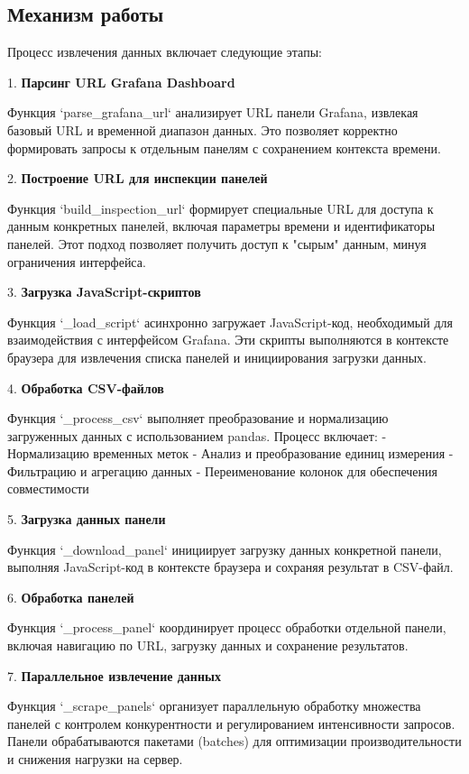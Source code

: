\subsection{Механизм работы}

Процесс извлечения данных включает следующие этапы:

1. \textbf{Парсинг URL Grafana Dashboard}

Функция `parse\_grafana\_url` анализирует URL панели Grafana, извлекая базовый
URL и временной диапазон данных. Это позволяет корректно формировать запросы
к отдельным панелям с сохранением контекста времени.

2. \textbf{Построение URL для инспекции панелей}

Функция `build\_inspection\_url` формирует специальные URL для доступа к
данным конкретных панелей, включая параметры времени и идентификаторы
панелей. Этот подход позволяет получить доступ к "сырым" данным, минуя
ограничения интерфейса.

3. \textbf{Загрузка JavaScript-скриптов}

Функция `\_load\_script` асинхронно загружает JavaScript-код, необходимый для
взаимодействия с интерфейсом Grafana. Эти скрипты выполняются в контексте
браузера для извлечения списка панелей и инициирования загрузки данных.

4. \textbf{Обработка CSV-файлов}

Функция `\_process\_csv` выполняет преобразование и нормализацию загруженных
данных с использованием pandas. Процесс включает: - Нормализацию временных
меток - Анализ и преобразование единиц измерения - Фильтрацию и агрегацию
данных - Переименование колонок для обеспечения совместимости

5. \textbf{Загрузка данных панели}

Функция `\_download\_panel` инициирует загрузку данных конкретной панели,
выполняя JavaScript-код в контексте браузера и сохраняя результат в
CSV-файл.

6. \textbf{Обработка панелей}

Функция `\_process\_panel` координирует процесс обработки отдельной панели,
включая навигацию по URL, загрузку данных и сохранение результатов.

7. \textbf{Параллельное извлечение данных}

Функция `\_scrape\_panels` организует параллельную обработку множества панелей
с контролем конкурентности и регулированием интенсивности запросов. Панели
обрабатываются пакетами (batches) для оптимизации производительности и
снижения нагрузки на сервер.

